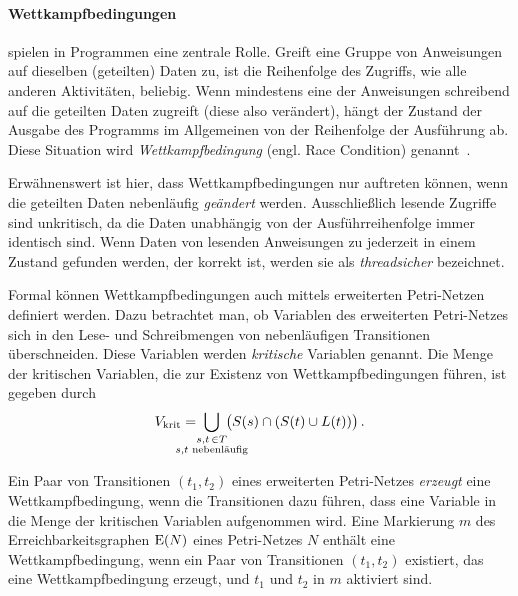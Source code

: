 \paragraph{Wettkampfbedingungen}
 spielen in Programmen eine zentrale Rolle. Greift eine Gruppe von Anweisungen auf dieselben (geteilten) Daten zu, ist die Reihenfolge des Zugriffs, wie alle anderen Aktivitäten, beliebig. Wenn mindestens eine der Anweisungen schreibend auf die geteilten Daten zugreift (diese also verändert), hängt der Zustand der Ausgabe des Programms im Allgemeinen von der Reihenfolge der Ausführung ab. Diese Situation wird \emph{Wettkampfbedingung} (engl. Race Condition) genannt~\cite{Hettel2016}. 

Erwähnenswert ist hier, dass Wettkampfbedingungen nur auftreten können, wenn die geteilten Daten nebenläufig \emph{geändert} werden. Ausschließlich lesende Zugriffe sind unkritisch, da die Daten unabhängig von der Ausführreihenfolge immer identisch sind. Wenn Daten von lesenden Anweisungen zu jederzeit in einem Zustand gefunden werden, der korrekt ist, werden sie als \emph{threadsicher} bezeichnet.

Formal können Wettkampfbedingungen auch mittels erweiterten Petri-Netzen definiert werden. Dazu betrachtet man, ob Variablen des erweiterten Petri-Netzes sich in den Lese- und Schreibmengen von nebenläufigen Transitionen überschneiden. Diese Variablen werden \emph{kritische} Variablen genannt. Die Menge der kritischen Variablen, die zur Existenz von Wettkampfbedingungen führen, ist gegeben durch
\begin{align*}
	V_\text{krit} = \;\bigcup_{\mathclap{\substack{s,t\, \in T\\s, t \text{ nebenläufig}}}} \;\left( \strut{S(s) \cap (S(t) \cup L(t))}\right).
\end{align*}

Ein Paar von Transitionen $(t_1, t_2)$ eines erweiterten Petri-Netzes \emph{erzeugt} eine Wettkampfbedingung, wenn die Transitionen dazu führen, dass eine Variable in die Menge der kritischen Variablen aufgenommen wird. Eine Markierung $m$ des Erreichbarkeitsgraphen $\operatorname{E}(N)$ eines Petri-Netzes $N$ enthält eine Wettkampfbedingung, wenn ein Paar von Transitionen $(t_1, t_2)$ existiert, das eine Wettkampfbedingung erzeugt, und $t_1$ und $t_2$ in $m$ aktiviert sind.

